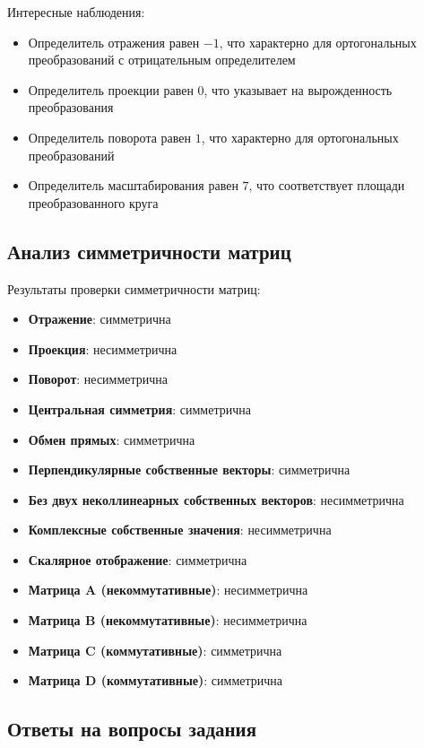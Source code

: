 Интересные наблюдения:
\begin{itemize}
\item Определитель отражения равен $-1$, что характерно для ортогональных преобразований с отрицательным определителем
\item Определитель проекции равен $0$, что указывает на вырожденность преобразования
\item Определитель поворота равен $1$, что характерно для ортогональных преобразований
\item Определитель масштабирования равен $7$, что соответствует площади преобразованного круга
\end{itemize}

\subsection*{Анализ симметричности матриц}

Результаты проверки симметричности матриц:

\begin{itemize}
\item \textbf{Отражение}: симметрична
\item \textbf{Проекция}: несимметрична
\item \textbf{Поворот}: несимметрична
\item \textbf{Центральная симметрия}: симметрична
\item \textbf{Обмен прямых}: симметрична
\item \textbf{Перпендикулярные собственные векторы}: симметрична
\item \textbf{Без двух неколлинеарных собственных векторов}: несимметрична
\item \textbf{Комплексные собственные значения}: несимметрична
\item \textbf{Скалярное отображение}: симметрична
\item \textbf{Матрица A (некоммутативные)}: несимметрична
\item \textbf{Матрица B (некоммутативные)}: несимметрична
\item \textbf{Матрица C (коммутативные)}: симметрична
\item \textbf{Матрица D (коммутативные)}: симметрична
\end{itemize}

\subsection*{Ответы на вопросы задания}

